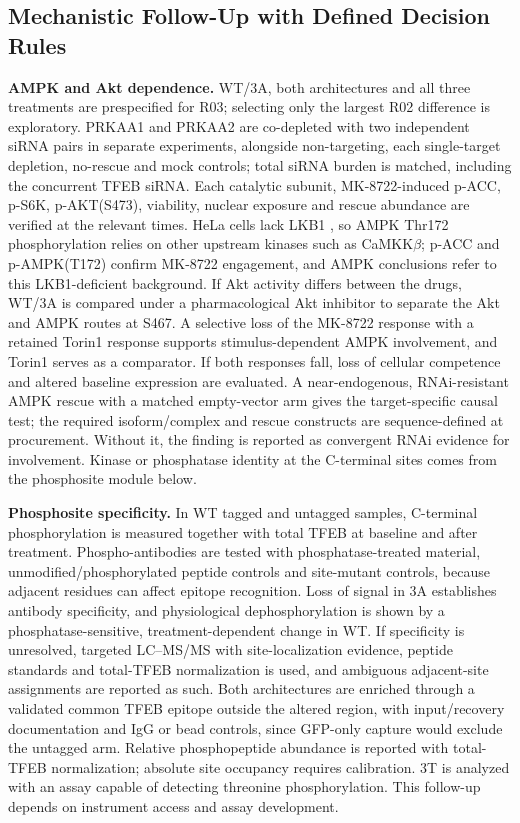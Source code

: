\subsection{Mechanistic Follow-Up with Defined Decision Rules}
\textbf{AMPK and Akt dependence.} WT/3A, both architectures and all three treatments are prespecified for R03; selecting only the largest R02 difference is exploratory. PRKAA1 and PRKAA2 are co-depleted with two independent siRNA pairs in separate experiments, alongside non-targeting, each single-target depletion, no-rescue and mock controls; total siRNA burden is matched, including the concurrent TFEB siRNA. Each catalytic subunit, MK-8722-induced p-ACC, p-S6K, p-AKT(S473), viability, nuclear exposure and rescue abundance are verified at the relevant times. HeLa cells lack LKB1 \cite{Fogarty2010}, so AMPK Thr172 phosphorylation relies on other upstream kinases such as CaMKK$\beta$; p-ACC and p-AMPK(T172) confirm MK-8722 engagement, and AMPK conclusions refer to this LKB1-deficient background. If Akt activity differs between the drugs, WT/3A is compared under a pharmacological Akt inhibitor to separate the Akt and AMPK routes at S467. A selective loss of the MK-8722 response with a retained Torin1 response supports stimulus-dependent AMPK involvement, and Torin1 serves as a comparator. If both responses fall, loss of cellular competence and altered baseline expression are evaluated. A near-endogenous, RNAi-resistant AMPK rescue with a matched empty-vector arm gives the target-specific causal test; the required isoform/complex and rescue constructs are sequence-defined at procurement. Without it, the finding is reported as convergent RNAi evidence for involvement. Kinase or phosphatase identity at the C-terminal sites comes from the phosphosite module below.

\textbf{Phosphosite specificity.} In WT tagged and untagged samples, C-terminal phosphorylation is measured together with total TFEB at baseline and after treatment. Phospho-antibodies are tested with phosphatase-treated material, unmodified/phosphorylated peptide controls and site-mutant controls, because adjacent residues can affect epitope recognition. Loss of signal in 3A establishes antibody specificity, and physiological dephosphorylation is shown by a phosphatase-sensitive, treatment-dependent change in WT. If specificity is unresolved, targeted LC--MS/MS with site-localization evidence, peptide standards and total-TFEB normalization is used, and ambiguous adjacent-site assignments are reported as such. Both architectures are enriched through a validated common TFEB epitope outside the altered region, with input/recovery documentation and IgG or bead controls, since GFP-only capture would exclude the untagged arm. Relative phosphopeptide abundance is reported with total-TFEB normalization; absolute site occupancy requires calibration. 3T is analyzed with an assay capable of detecting threonine phosphorylation. This follow-up depends on instrument access and assay development.

